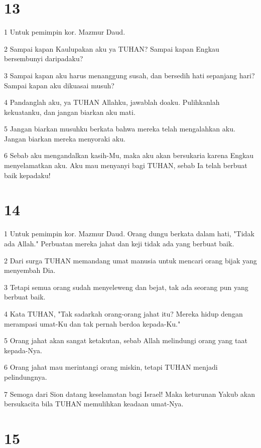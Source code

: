 \chapter{13}

\par 1 Untuk pemimpin kor. Mazmur Daud.
\par 2 Sampai kapan Kaulupakan aku ya TUHAN? Sampai kapan Engkau bersembunyi daripadaku?
\par 3 Sampai kapan aku harus menanggung susah, dan bersedih hati sepanjang hari? Sampai kapan aku dikuasai musuh?
\par 4 Pandanglah aku, ya TUHAN Allahku, jawablah doaku. Pulihkanlah kekuatanku, dan jangan biarkan aku mati.
\par 5 Jangan biarkan musuhku berkata bahwa mereka telah mengalahkan aku. Jangan biarkan mereka menyoraki aku.
\par 6 Sebab aku mengandalkan kasih-Mu, maka aku akan bersukaria karena Engkau menyelamatkan aku. Aku mau menyanyi bagi TUHAN, sebab Ia telah berbuat baik kepadaku!

\chapter{14}

\par 1 Untuk pemimpin kor. Mazmur Daud. Orang dungu berkata dalam hati, "Tidak ada Allah." Perbuatan mereka jahat dan keji tidak ada yang berbuat baik.
\par 2 Dari surga TUHAN memandang umat manusia untuk mencari orang bijak yang menyembah Dia.
\par 3 Tetapi semua orang sudah menyeleweng dan bejat, tak ada seorang pun yang berbuat baik.
\par 4 Kata TUHAN, "Tak sadarkah orang-orang jahat itu? Mereka hidup dengan merampasi umat-Ku dan tak pernah berdoa kepada-Ku."
\par 5 Orang jahat akan sangat ketakutan, sebab Allah melindungi orang yang taat kepada-Nya.
\par 6 Orang jahat mau merintangi orang miskin, tetapi TUHAN menjadi pelindungnya.
\par 7 Semoga dari Sion datang keselamatan bagi Israel! Maka keturunan Yakub akan bersukacita bila TUHAN memulihkan keadaan umat-Nya.

\chapter{15}

